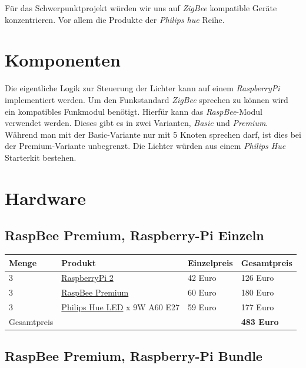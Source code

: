 \documentclass[a4paper,12pt]{article}
\begin{document}
Für das Schwerpunktprojekt würden wir uns auf \textit{ZigBee} kompatible Geräte
konzentrieren. Vor allem die Produkte der \textit{Philips hue} Reihe.

\section{Komponenten}

Die eigentliche Logik zur Steuerung der Lichter kann auf einem \textit{RaspberryPi}
implementiert werden. Um den Funkstandard \textit{ZigBee} sprechen zu können wird ein
kompatibles Funkmodul benötigt. Hierfür kann das \textit{RaspBee}-Modul verwendet werden.
Dieses gibt es in zwei Varianten, \textit{Basic} und \textit{Premium}. Während man mit der
Basic-Variante nur mit 5 Knoten sprechen darf, ist dies bei der Premium-Variante
unbegrenzt. Die Lichter würden aus einem \textit{Philips Hue} Starterkit bestehen.

\section{Hardware}

\subsection{RaspBee Premium, Raspberry-Pi Einzeln}

\begin{tabular}{p{2cm}p{4.5cm}p{3cm}p{3cm}}
   Menge & Produkt & Einzelpreis & Gesamtpreis\\
   \hline
   3 & \href{http://www.conrad.de/ce/de/product/1316978/Raspberry-Pi-2-Model-B-1-GB-ohne-Betriebssystem}{RaspberryPi 2} & 42 Euro & 126 Euro\\
   3 & \href{http://www.conrad.de/ce/de/product/1369407/Raspberry-Pi-Erweiterungs-Platine-Zigbee-200-Knotenpunkte-Raspberry-Pi}{RaspBee Premium} & 60 Euro & 180 Euro\\
   3 & \href{http://www.conrad.de/ce/de/product/1314141/Philips-Hue-LED-Leuchtmittel-Erweiterung-E27-9-W-RGB}{Philips Hue LED}
        \newline 1 x 9W A60 E27 & 59 Euro & 177 Euro\\
   \hline
   Gesamtpreis & & & \textbf{483 Euro}\\
\end{tabular}

\subsection{RaspBee Premium, Raspberry-Pi Bundle}
\end{document}
